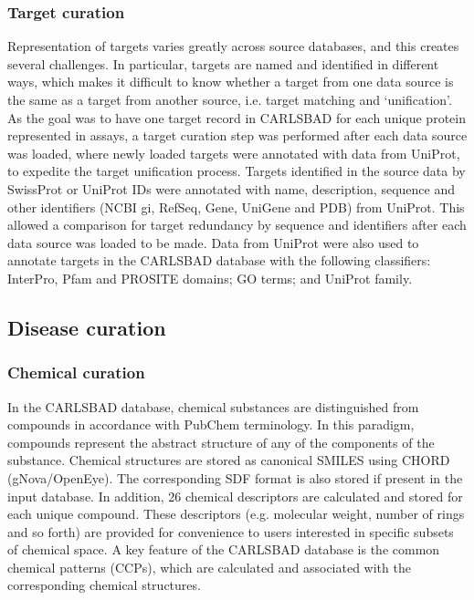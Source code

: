 \subsubsection{Target curation}

Representation of targets varies greatly across source databases, and this creates several challenges. In particular, targets are named and identified in different ways, which makes it difficult to know whether a target from one data source is the same as a target from another source, i.e. target matching and ‘unification’. As the goal was to have one target record in CARLSBAD for each unique protein represented in assays, a target curation step was performed after each data source was loaded, where newly loaded targets were annotated with data from UniProt\cite{UniProt_Consortium2018-kq}, to expedite the target unification process. Targets identified in the source data by SwissProt or UniProt IDs were annotated with name, description, sequence and other identifiers (NCBI gi, RefSeq, Gene, UniGene and PDB) from UniProt. This allowed a comparison for target redundancy by sequence and identifiers after each data source was loaded to be made. Data from UniProt were also used to annotate targets in the CARLSBAD database with the following classifiers: InterPro, Pfam and PROSITE domains; GO terms; and UniProt family.

\subsection{Disease curation}


\subsubsection{Chemical curation}

In the CARLSBAD database, chemical substances are distinguished from compounds in accordance with PubChem terminology. In this paradigm, compounds represent the abstract structure of any of the components of the substance. Chemical structures are stored as canonical SMILES using CHORD (gNova/OpenEye). The corresponding SDF format is also stored if present in the input database. In addition, 26 chemical descriptors are calculated and stored for each unique compound. These descriptors (e.g. molecular weight, number of rings and so forth) are provided for convenience to users interested in specific subsets of chemical space. A key feature of the CARLSBAD database is the common chemical patterns (CCPs), which are calculated and associated with the corresponding chemical structures.

